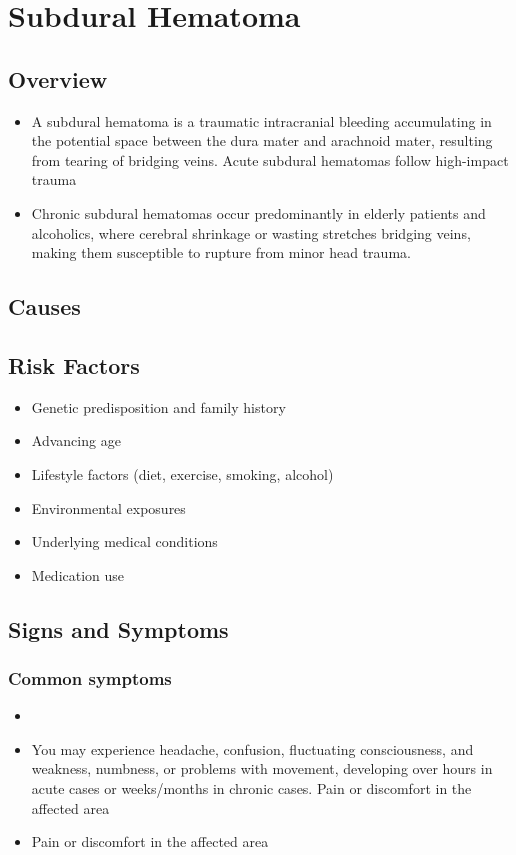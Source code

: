\chapter{Subdural Hematoma}
\label{sec:Subdural Hematoma}

\section{Overview}


\begin{itemize}[noitemsep]
  \item A subdural hematoma is a traumatic intracranial bleeding accumulating in the potential space between the dura mater and arachnoid mater, resulting from tearing of bridging veins. Acute subdural hematomas follow high-impact trauma
  \item Chronic subdural hematomas occur predominantly in elderly patients and alcoholics, where cerebral shrinkage or wasting stretches bridging veins, making them susceptible to rupture from minor head trauma.
\end{itemize}
\section{Causes}
\section{Risk Factors}

\begin{itemize}[noitemsep]
  \item Genetic predisposition and family history
  \item Advancing age
  \item Lifestyle factors (diet, exercise, smoking, alcohol)
  \item Environmental exposures
  \item Underlying medical conditions
  \item Medication use
\end{itemize}
\section{Signs and Symptoms}

\subsection{Common symptoms}
\begin{itemize}[noitemsep]
  \item \item You may experience headache, confusion, fluctuating consciousness, and weakness, numbness, or problems with movement, developing over hours in acute cases or weeks/months in chronic cases. Pain or discomfort in the affected area    \item Pain or discomfort in the affected area
  \end{itemize}

